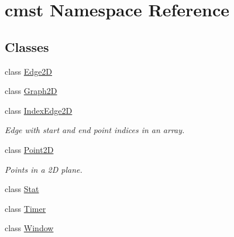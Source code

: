 \hypertarget{namespacecmst}{}\section{cmst Namespace Reference}
\label{namespacecmst}
\subsection*{Classes}
\begin{DoxyCompactItemize}
\item 
class \hyperlink{classcmst_1_1_edge2_d}{Edge2D}
\item 
class \hyperlink{classcmst_1_1_graph2_d}{Graph2D}
\item 
class \hyperlink{classcmst_1_1_index_edge2_d}{IndexEdge2D}
\begin{DoxyCompactList}\small\item\em Edge with start and end point indices in an array. \end{DoxyCompactList}\item 
class \hyperlink{classcmst_1_1_point2_d}{Point2D}
\begin{DoxyCompactList}\small\item\em Points in a 2D plane. \end{DoxyCompactList}\item 
class \hyperlink{classcmst_1_1_stat}{Stat}
\item 
class \hyperlink{classcmst_1_1_timer}{Timer}
\item 
class \hyperlink{classcmst_1_1_window}{Window}
\end{DoxyCompactItemize}
